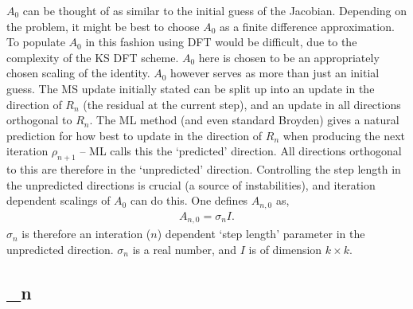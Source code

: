 $A_0$ can be thought of as similar to the initial guess of the Jacobian. Depending on the problem, it might be best to choose $A_0$ as a finite difference approximation. To populate $A_0$ in this fashion using DFT would be difficult, due to the complexity of the KS DFT scheme. $A_0$ here is chosen to be an appropriately chosen scaling of the identity. $A_0$ however serves as more than just an initial guess. The MS update initially stated can be split up into an update in the direction of $R_n$ (the residual at the current step), and an update in all directions orthogonal to $R_n$. The ML method (and even standard Broyden) gives a natural prediction for how best to update in the direction of $R_n$ when producing the next iteration $\rho_{n+1}$ -- ML calls this the `predicted' direction. All directions orthogonal to this are therefore in the `unpredicted' direction. Controlling the step length in the unpredicted directions is crucial (a source of instabilities), and iteration dependent scalings of $A_0$ can do this. One defines $A_{n,0}$ as,
\begin{align}
A_{n,0} = \sigma_n I.
\end{align}
 $\sigma_n$ is therefore an interation ($n$) dependent `step length' parameter in the unpredicted direction.  $\sigma_n$ is a real number, and $I$ is of dimension $k \times k$.

\subsection{\sigma_n}

